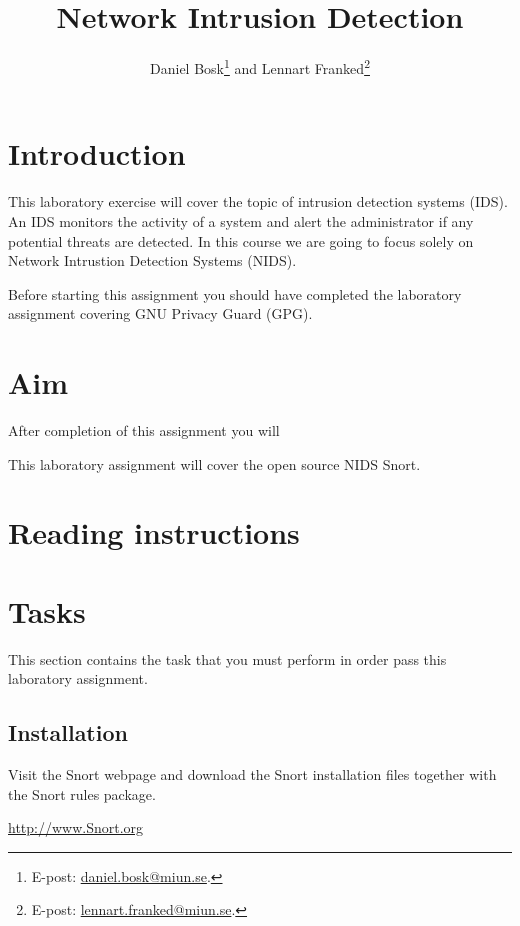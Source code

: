 \documentclass[a4paper,nocourse]{miunasgn}
\title{Network Intrusion Detection}
\author{Daniel Bosk\footnote{%
        E-post: \protect\url{daniel.bosk@miun.se}.
        } and
        Lennart Franked\footnote{%
            E-post: \protect\url{lennart.franked@miun.se}.
        }
}
\date{\svnId}
\begin{document}
\maketitle
\thispagestyle{foot}
\tableofcontents

\section{Introduction}
\label{sec:Introduction}
This laboratory exercise will cover the topic of intrusion detection
systems (IDS). An IDS monitors the activity of a system and alert the 
administrator if any potential threats are detected. In this course we are 
going to focus solely on Network Intrustion Detection Systems (NIDS).

Before starting this assignment you should have completed the laboratory
assignment covering GNU Privacy Guard (GPG).

\section{Aim}
\label{sec:Aim}
After completion of this assignment you will
\begin{itemize}
    
\end{itemize}

This laboratory assignment will cover the open source NIDS Snort.

\section{Reading instructions}
\label{sec:Readinginstructions}


\section{Tasks}
\label{sec:Tasks}
This section contains the task that you must perform in order pass this
laboratory assignment.

\subsection{Installation}
\label{subsec:Install}
Visit the Snort webpage and download the Snort installation files together with
the Snort rules package.

\begin{center}
\url{http://www.Snort.org}
\end{center}
\end{document}
